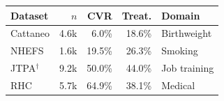 \begin{tabular}{lrrrl}
\toprule
Dataset & $n$ & CVR & Treat. & Domain \\
\midrule
Cattaneo \citep{cattaneo2010} & 4.6k & 6.0\% & 18.6\% & Birthweight \\
NHEFS \citep{hernan2020} & 1.6k & 19.5\% & 26.3\% & Smoking \\
JTPA$^\dagger$ \citep{abadie2002} & 9.2k & 50.0\% & 44.0\% & Job training \\
RHC \citep{connors1996rhc} & 5.7k & 64.9\% & 38.1\% & Medical \\
\bottomrule
\end{tabular}
